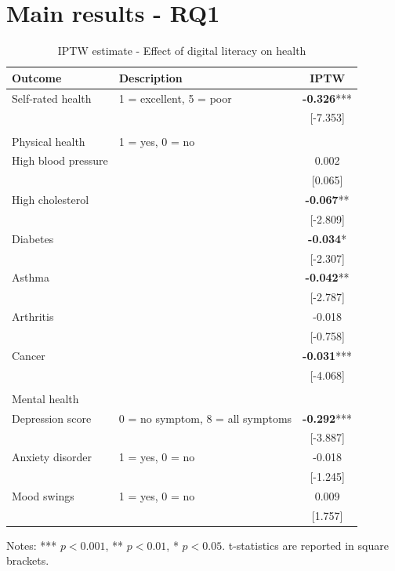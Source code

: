 \section{Main results - RQ1}

\begin{table}[h!]
    \centering
    \caption{IPTW estimate - Effect of digital literacy on health}
    \label{tab:iptw}
    \begin{threeparttable}
        \begin{tabular}{llc}
            \toprule
            Outcome & Description & IPTW \\
            \midrule
            Self-rated health & 1 = excellent, 5 = poor & \textbf{-0.326}*** \\
            & & [-7.353] \\
            & & \\
            Physical health & 1 = yes, 0 = no & \\
            High blood pressure &  & 0.002 \\
            &  & [0.065] \\
            High cholesterol &  & \textbf{-0.067}** \\
            &  & [-2.809] \\
            Diabetes &  & \textbf{-0.034}* \\
            &  & [-2.307] \\
            Asthma &  & \textbf{-0.042}** \\
            &  & [-2.787] \\
            Arthritis &  & -0.018 \\
            &  & [-0.758] \\
            Cancer &  & \textbf{-0.031}*** \\
            &  & [-4.068] \\
            & & \\
            Mental health & & \\
            Depression score & 0 = no symptom, 8 = all symptoms & \textbf{-0.292}*** \\
            & & [-3.887] \\
            Anxiety disorder & 1 = yes, 0 = no  & -0.018 \\
            &  & [-1.245] \\
            Mood swings & 1 = yes, 0 = no  & 0.009 \\
            &  & [1.757] \\
            \bottomrule
        \end{tabular}
        \begin{tablenotes}
            \footnotesize
            \item Notes: *** $p < 0.001$, ** $p < 0.01$, * $p < 0.05$. t-statistics are reported in square brackets.
        \end{tablenotes}
    \end{threeparttable}
\end{table}



